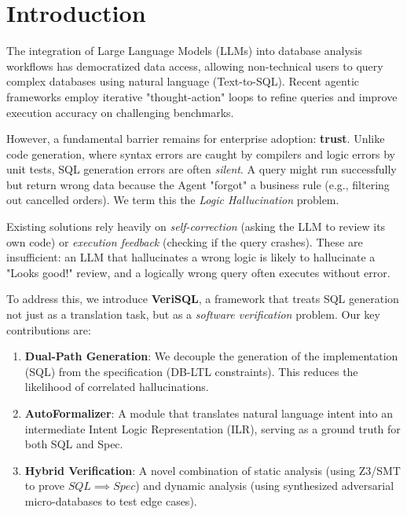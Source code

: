 \documentclass[sigconf,review,anonymous]{acmart}
\begin{document}
\maketitle

\section{Introduction}

The integration of Large Language Models (LLMs) into database analysis workflows has democratized data access, allowing non-technical users to query complex databases using natural language (Text-to-SQL). Recent agentic frameworks employ iterative "thought-action" loops to refine queries and improve execution accuracy on challenging benchmarks.

However, a fundamental barrier remains for enterprise adoption: \textbf{trust}. Unlike code generation, where syntax errors are caught by compilers and logic errors by unit tests, SQL generation errors are often \textit{silent}. A query might run successfully but return wrong data because the Agent "forgot" a business rule (e.g., filtering out cancelled orders). We term this the \textit{Logic Hallucination} problem.

Existing solutions rely heavily on \textit{self-correction} (asking the LLM to review its own code) or \textit{execution feedback} (checking if the query crashes). These are insufficient: an LLM that hallucinates a wrong logic is likely to hallucinate a "Looks good!" review, and a logically wrong query often executes without error.

To address this, we introduce \textbf{VeriSQL}, a framework that treats SQL generation not just as a translation task, but as a \textit{software verification} problem. Our key contributions are:

\begin{enumerate}
    \item \textbf{Dual-Path Generation}: We decouple the generation of the implementation (SQL) from the specification (DB-LTL constraints). This reduces the likelihood of correlated hallucinations.
  \item \textbf{AutoFormalizer}: A module that translates natural language intent into an intermediate Intent Logic Representation (ILR), serving as a ground truth for both SQL and Spec.
    \item \textbf{Hybrid Verification}: A novel combination of static analysis (using Z3/SMT to prove $SQL \implies Spec$) and dynamic analysis (using synthesized adversarial micro-databases to test edge cases).
\end{enumerate}
\end{document}
